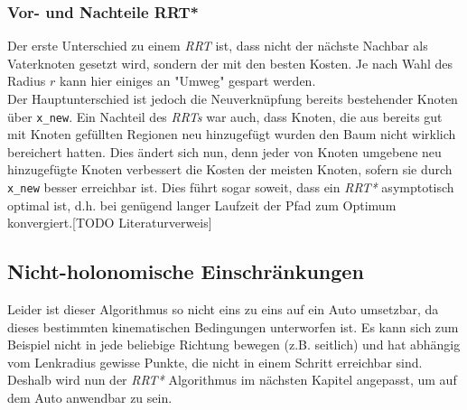 \subsubsection{Vor- und Nachteile RRT*}
Der erste Unterschied zu einem \textit{RRT} ist, dass nicht der nächste Nachbar als Vaterknoten gesetzt wird, sondern der mit den besten Kosten. Je nach Wahl des Radius $r$ kann hier einiges an "Umweg" gespart werden. \\
Der Hauptunterschied ist jedoch die Neuverknüpfung bereits bestehender Knoten über \verb|x_new|. Ein Nachteil des \textit{RRTs} war auch, dass Knoten, die aus bereits gut mit Knoten gefüllten Regionen neu hinzugefügt wurden den Baum nicht wirklich bereichert hatten. Dies ändert sich nun, denn jeder von Knoten umgebene neu hinzugefügte Knoten verbessert die Kosten der meisten Knoten, sofern sie durch \verb|x_new| besser erreichbar ist. Dies führt sogar soweit, dass ein \textit{RRT*} asymptotisch optimal ist, d.h. bei genügend langer Laufzeit der Pfad zum Optimum konvergiert.[TODO Literaturverweis]
\subsection{Nicht-holonomische Einschränkungen}
Leider ist dieser Algorithmus so nicht eins zu eins auf ein Auto umsetzbar, da dieses bestimmten kinematischen Bedingungen unterworfen ist. Es kann sich zum Beispiel nicht in jede beliebige Richtung bewegen (z.B. seitlich) und hat abhängig vom Lenkradius gewisse Punkte, die nicht in einem Schritt erreichbar sind. Deshalb wird nun der\textit{ RRT*} Algorithmus im nächsten Kapitel angepasst, um auf dem Auto anwendbar zu sein.